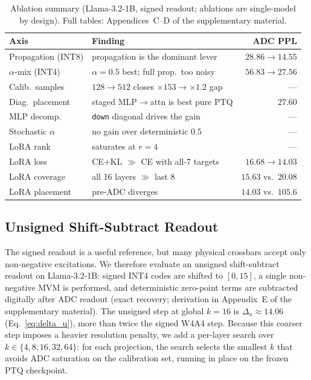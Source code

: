 \documentclass[letterpaper]{article} %
\theoremstyle{plain}
\begin{document}
\begin{table}[t]
\centering
\footnotesize
\setlength{\tabcolsep}{3pt}
\begin{tabular}{@{}p{1.85cm}p{3.35cm}r@{}}
\toprule
Axis & Finding & ADC PPL \\
\midrule
Propagation (INT8) & propagation is the dominant lever & $28.86 \to 14.55$ \\
$\alpha$-mix (INT4) & $\alpha{=}0.5$ best; full prop.\ too noisy & $56.83 \to 27.56$ \\
Calib.\ samples & $128{\to}512$ closes $\times153 \to \times1.2$ gap & --- \\
Diag.\ placement & staged MLP${\to}$attn is best pure PTQ & $27.60$ \\
MLP decomp. & \texttt{down} diagonal drives the gain & --- \\
Stochastic $\alpha$ & no gain over deterministic $0.5$ & --- \\
LoRA rank & saturates at $r{=}4$ & --- \\
LoRA loss & CE+KL $\gg$ CE with all-7 targets & $16.68 \to 14.03$ \\
LoRA coverage & all 16 layers $\gg$ last 8 & $15.63$ vs.\ $20.08$ \\
LoRA placement & pre-ADC diverges & $14.03$ vs.\ $105.6$ \\
\bottomrule
\end{tabular}
\caption{Ablation summary (Llama-3.2-1B, signed readout; ablations are single-model by design). Full tables: Appendices~C--D of the supplementary material.}
\label{tab:ablation}
\end{table}

\subsection{Unsigned Shift-Subtract Readout}

The signed readout is a useful reference, but many physical crossbars accept only non-negative excitations. We therefore evaluate an unsigned shift-subtract readout on Llama-3.2-1B: signed INT4 codes are shifted to $[0,15]$, a single non-negative MVM is performed, and deterministic zero-point terms are subtracted digitally after ADC readout (exact recovery; derivation in Appendix~E of the supplementary material). The unsigned step at global $k = 16$ is $\Delta_u \approx 14.06$ (Eq.~\ref{eq:delta_u}), more than twice the signed W4A4 step. Because this coarser step imposes a heavier resolution penalty, we add a per-layer search over $k \in \{4,8,16,32,64\}$: for each projection, the search selects the smallest $k$ that avoids ADC saturation on the calibration set, running in place on the frozen PTQ checkpoint.
\end{document}
